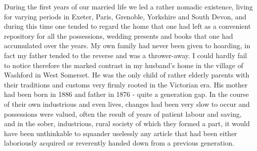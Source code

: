 
During the first years of our married life we led a rather nomadic existence, living for varying periods in Exeter, Paris, Grenoble, Yorkshire and South Devon, and during this time one tended to regard the home that one had left as a convenient repository for all the possessions, wedding presents and books that one had accumulated over the years. My own family had never been given to hoarding, in fact my father tended to the reverse and was a thrower-away. I could hardly fail to notice therefore the marked contrast in my husband’s home in the village of Washford in West Somerset. He was the only child of rather elderly parents with their traditions and customs very firmly rooted in the Victorian era. His mother had been born in 1886 and father in 1876 - quite a generation gap. In the course of their own industrious and even lives, changes had been very slow to occur and possessions were valued, often the result of years of patient labour and saving, and in the sober, industrious, rural society of which they formed a part, it would have been unthinkable to squander uselessly any article that had been either laboriously acquired or reverently handed down from a previous generation.

